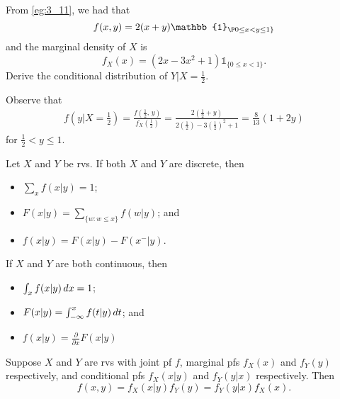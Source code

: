 \documentclass[notoc,notitlepage]{tufte-book}
\begin{document}
\begin{eg}[Example 3.14]
  From \cref{eg:3_11}, we had that
  \begin{equation*}
    f(x, y) = 2 ( x + y ) \mathbb{1}_{\P0 \leq x < y \leq 1\}}
  \end{equation*}
  and the marginal density of $X$ is
  \begin{equation*}
    f_X(x) = (2x - 3x^2 + 1) \mathbb{1}_{\{ 0 \leq x < 1 \}}.
  \end{equation*}
  Derive the conditional distribution of $Y | X = \frac{1}{2}$.

  \begin{solution}
    Observe that
    \begin{align*}
      f(y | X = \frac{1}{2}) = \frac{f \left( \frac{1}{2}, \, y \right)}{f_X \left( \frac{1}{2} \right)} = \frac{2 \left( \frac{1}{2} + y \right)}{2 \left( \frac{1}{2} \right) - 3 \left( \frac{1}{2} \right)^2 + 1} = \frac{8}{13} ( 1 + 2y )
    \end{align*}
    for $\frac{1}{2} < y \leq 1$.
  \end{solution}
\end{eg}

\begin{propo}
\label{propo:properties_of_conditional_distributions}
  Let $X$ and $Y$ be rvs. If both $X$ and $Y$ are discrete, then
  \begin{itemize}
    \item $\sum_{x} f(x | y) = 1$;
    \item $F(x | y) = \sum_{\{w : w \leq x\}} f(w | y)$; and
    \item $f(x | y) = F(x | y) - F(x^- | y)$.
  \end{itemize}
  If $X$ and $Y$ are both continuous, then
  \begin{itemize}
    \item $\int_{x} f(x | y) \mathop{}\!d{x} = 1$;
    \item $F(x | y) = \int_{-\infty}^{x} f(t | y) \mathop{}\!d{t}$; and
    \item $f(x | y) = \frac{\partial}{\partial x} F(x | y)$
  \end{itemize}
\end{propo}

\begin{thm}
\label{thm:product_rule}
  Suppose $X$ and $Y$ are rvs with joint pf $f$, marginal pfs $f_X(x)$ and $f_Y(y)$ respectively, and conditional pfs $f_X(x | y)$ and $f_Y(y | x)$ respectively. Then
  \begin{equation*}
    f(x, y) = f_X(x | y) f_Y(y) = f_Y(y | x) f_X(x).
  \end{equation*}
\end{thm}
\end{document}
